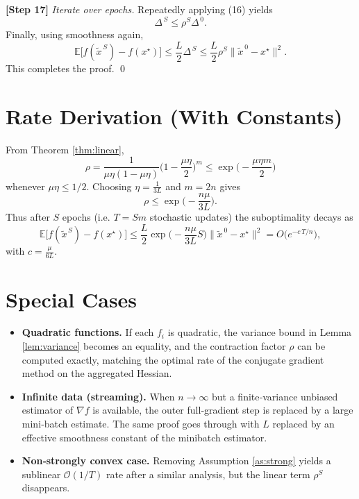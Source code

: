 \documentclass[11pt]{article}
\newcommand{\E}{\mathbb{E}}
\begin{document}
\noindent\textbf{[Step 17]} \emph{Iterate over epochs.}  
Repeatedly applying (16) yields
\[
\Delta^{\,S}\le \rho^{S}\Delta^{\,0}.
\]
Finally, using smoothness again,
\[
\E\!\big[f(\tilde{x}^{\,S})-f(x^{\star})\big]
\le \frac{L}{2}\Delta^{\,S}
\le \frac{L}{2}\rho^{S}\| \tilde{x}^{\,0}-x^{\star}\|^{2}.
\]
This completes the proof. \qed

\section*{Rate Derivation (With Constants)}
From Theorem \ref{thm:linear},
\[
\rho = \frac{1}{\mu\eta(1-\mu\eta)}\Big(1-\frac{\mu\eta}{2}\Big)^{m}
      \le \exp\!\Big(-\frac{\mu\eta m}{2}\Big)
\]
whenever $\mu\eta\le 1/2$. Choosing $\eta = \frac{1}{3L}$ and $m=2n$ gives
\[
\rho \le \exp\!\Big(-\frac{n\mu}{3L}\Big).
\]
Thus after $S$ epochs (i.e. $T=Sm$ stochastic updates) the suboptimality decays as
\[
\E\!\big[f(\tilde{x}^{\,S})-f(x^{\star})\big]
\le \frac{L}{2}\exp\!\Big(-\frac{n\mu}{3L}S\Big)\| \tilde{x}^{\,0}-x^{\star}\|^{2}
= O\!\big(e^{-c\,T/n}\big),
\]
with $c=\frac{\mu}{6L}$.

\section*{Special Cases}
\begin{itemize}
\item \textbf{Quadratic functions.} If each $f_i$ is quadratic, the variance bound in Lemma \ref{lem:variance} becomes an equality, and the contraction factor $\rho$ can be computed exactly, matching the optimal rate of the conjugate gradient method on the aggregated Hessian.
\item \textbf{Infinite data (streaming).} When $n\to\infty$ but a finite‑variance unbiased estimator of $\nabla f$ is available, the outer full‑gradient step is replaced by a large mini‑batch estimate. The same proof goes through with $L$ replaced by an effective smoothness constant of the minibatch estimator.
\item \textbf{Non‑strongly convex case.} Removing Assumption \ref{as:strong} yields a sublinear $\mathcal{O}(1/T)$ rate after a similar analysis, but the linear term $\rho^{S}$ disappears.
\end{itemize}
\end{document}
